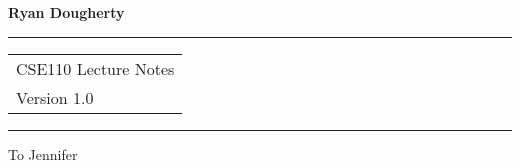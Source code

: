 \documentclass{llncs}
\newenvironment{dedication}
  {\clearpage           %
   \thispagestyle{empty}%
   \vspace*{\stretch{1}}%
   \itshape             %
   \raggedleft          %
  }
  {\par %
   \vspace{\stretch{3}} %
   \clearpage           %
  }
\begin{document}
\thispagestyle{empty}
\begin{flushleft}
\LARGE\bfseries Ryan Dougherty\\[2cm]
\end{flushleft}
\rule{\textwidth}{1pt}
\vspace{2pt}
\begin{flushright}
\Huge
\begin{tabular}{@{}l}
CSE110 Lecture Notes\\[6pt]
{\Large Version 1.0}
\end{tabular}
\end{flushright}
\rule{\textwidth}{1pt}
\vfill
\newpage

\begin{dedication}
To Jennifer
\end{dedication}

%
\newpage
\newpage
\newpage
\newpage
\newpage
\newpage
\newpage
\newpage
\newpage
\newpage
\newpage

\end{document}
